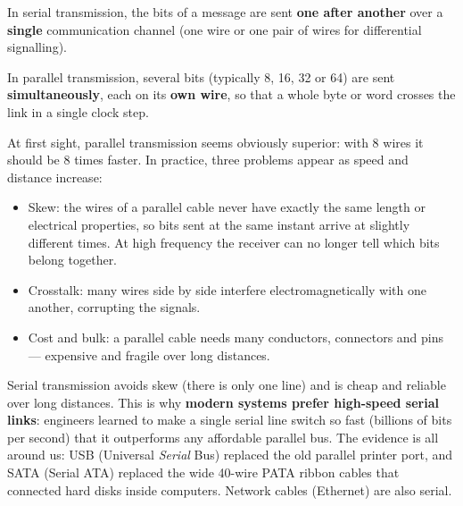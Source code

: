 \documentclass[11pt]{article}
\newcommand{\cle}[1]{{\popxbold\color{popdark}#1}}
\begin{document}
\begin{definition}
In \cle{serial transmission}, the bits of a message are sent \textbf{one after another} over a \textbf{single} communication channel (one wire or one pair of wires for differential signalling).

In \cle{parallel transmission}, several bits (typically 8, 16, 32 or 64) are sent \textbf{simultaneously}, each on its \textbf{own wire}, so that a whole byte or word crosses the link in a single clock step.
\end{definition}

At first sight, parallel transmission seems obviously superior: with 8 wires it should be 8 times faster. In practice, three problems appear as speed and distance increase:

\begin{itemize}
\item \cle{Skew}: the wires of a parallel cable never have exactly the same length or electrical properties, so bits sent at the same instant arrive at slightly different times. At high frequency the receiver can no longer tell which bits belong together.
\item \cle{Crosstalk}: many wires side by side interfere electromagnetically with one another, corrupting the signals.
\item \cle{Cost and bulk}: a parallel cable needs many conductors, connectors and pins --- expensive and fragile over long distances.
\end{itemize}

Serial transmission avoids skew (there is only one line) and is cheap and reliable over long distances. This is why \textbf{modern systems prefer high-speed serial links}: engineers learned to make a single serial line switch so fast (billions of bits per second) that it outperforms any affordable parallel bus. The evidence is all around us: \cle{USB} (Universal \emph{Serial} Bus) replaced the old parallel printer port, and \cle{SATA} (Serial ATA) replaced the wide 40-wire \cle{PATA} ribbon cables that connected hard disks inside computers. Network cables (Ethernet) are also serial.
\end{document}
